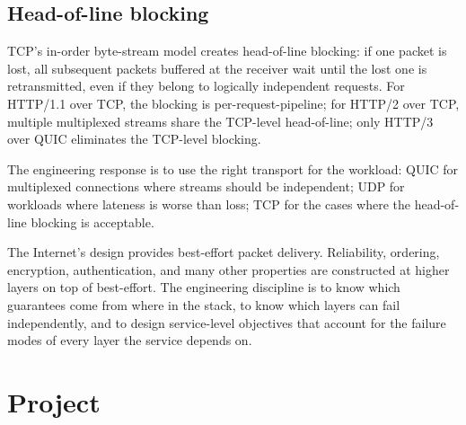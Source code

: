 \subsection{Head-of-line blocking}

TCP's in-order byte-stream model creates head-of-line blocking: if one packet is lost, all subsequent packets buffered at the receiver wait until the lost one is retransmitted, even if they belong to logically independent requests. For HTTP/1.1 over TCP, the blocking is per-request-pipeline; for HTTP/2 over TCP, multiple multiplexed streams share the TCP-level head-of-line; only HTTP/3 over QUIC eliminates the TCP-level blocking.

The engineering response is to use the right transport for the workload: QUIC for multiplexed connections where streams should be independent; UDP for workloads where lateness is worse than loss; TCP for the cases where the head-of-line blocking is acceptable.

\begin{principle}
The Internet's design provides best-effort packet delivery. Reliability, ordering, encryption, authentication, and many other properties are constructed at higher layers on top of best-effort. The engineering discipline is to know which guarantees come from where in the stack, to know which layers can fail independently, and to design service-level objectives that account for the failure modes of every layer the service depends on.
\end{principle}

\section{Project}

